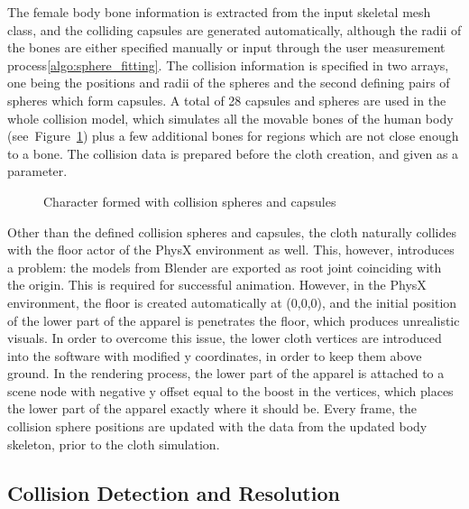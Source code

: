 The female body bone information is extracted from the input skeletal mesh class, and the colliding capsules are generated automatically, although the radii of the bones are either specified manually or input through the user measurement process\ref{algo:sphere_fitting}. The collision information is specified in two arrays, one being the positions and radii of the spheres and the second defining pairs of spheres which form capsules. A total of 28 capsules and spheres are used in the whole collision model, which simulates all the movable bones of the human body (see~Figure~\ref{fig:colliding_human_body}) plus a few additional bones for regions which are not close enough to a bone.  The collision data is prepared before the cloth creation, and given as a parameter. 

\begin{figure}[h]
\centerline{}
\caption{Character formed with collision spheres and capsules}
\label{fig:colliding_human_body}
\end{figure}

Other than the defined collision spheres and capsules, the cloth naturally collides with the floor actor of the PhysX environment as well. This, however, introduces a problem: the models from Blender are exported as root joint coinciding with the origin. This is required for successful animation. However, in the PhysX environment, the floor is created automatically at (0,0,0), and the initial position of the lower part of the apparel is penetrates the floor, which produces unrealistic visuals. In order to overcome this issue, the lower cloth vertices are introduced into the software with modified y coordinates, in order to keep them above ground. In the rendering process, the lower part of the apparel is attached to a scene node with negative y offset equal to the boost in the vertices, which places the lower part of the apparel exactly where it should be. Every frame, the collision sphere positions are updated with the data from the updated body skeleton, prior to the cloth simulation. 

\subsection{Collision Detection and Resolution}

